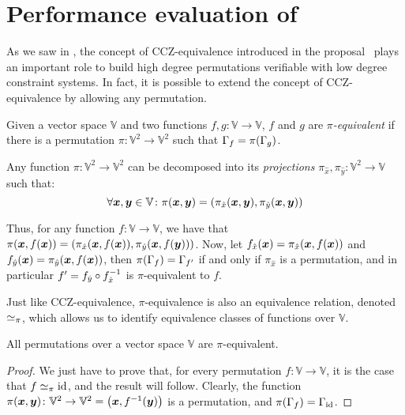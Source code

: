 \section{Performance evaluation of \Arion}\label{sec:performance}
As we saw in , the concept of CCZ-equivalence introduced in the \Anemoi{} 
proposal~\cite{BouvierBCPSVW2022} plays an important role to build high degree permutations 
verifiable with low degree constraint systems.
In fact, it is possible to extend the concept of CCZ-equivalence by allowing any permutation.
\begin{definition}[\(\pi \)-equivalence]
  Given a vector space \(\mathbb{V}\) and two functions \(f,g\colon \mathbb{V} \to \mathbb{V}\), 
  \(f\) and \(g\) are \emph{\(\pi \)-equivalent} if there is a permutation 
  \(\pi\colon \mathbb{V}^2 \to \mathbb{V}^2\) such that \(\Gamma_{f} = \call{\pi}{\Gamma_{g}}\).
\end{definition}

Any function \(\pi\colon \mathbb{V}^2 \to \mathbb{V}^2\) can be decomposed into its 
\emph{projections} \(\pi_{\hat{x}}, \pi_{\hat{y}}\colon \mathbb{V}^2 \to \mathbb{V}\) such that:
\[
  \forall \bm{x}, \bm{y} \in \mathbb{V}\colon \call{\pi}{\bm{x}, \bm{y}} = 
    \Tuple{\call{\pi_{\hat{x}}}{\bm{x}, \bm{y}}, \call{\pi_{\hat{y}}}{\bm{x}, \bm{y}}}
\]

Thus, for any function \(f\colon \mathbb{V} \to \mathbb{V}\), we have that 
\(\call{\pi}{\bm{x}, \call{f}{\bm{x}}} = 
  \Tuple{\call{\pi_{\hat{x}}}{\bm{x}, \call{f}{\bm{x}}}, 
  \call{\pi_{\hat{y}}}{\bm{x}, \call{f}{\bm{y}}}}\).
Now, let \(\call{f_{\hat{x}}}{\bm{x}} = \call{\pi_{\hat{x}}}{\bm{x}, \call{f}{\bm{x}}}\) and 
\(\call{f_{\hat{y}}}{\bm{x}} = \call{\pi_{\hat{y}}}{\bm{x}, \call{f}{\bm{x}}}\), then 
\(\call{\pi}{\Gamma_f} = \Gamma_{f'}\) if and only if \(\pi_{\hat{x}}\) is a permutation, and 
in particular \(f' = f_{\hat{y}} \circ f_{\hat{x}}^{-1}\) is \(\pi \)-equivalent to \(f\).

Just like CCZ-equivalence, \(\pi \)-equivalence is also an equivalence relation, denoted 
\(\simeq_{\pi} \), which allows us to identify equivalence classes of functions over \(\mathbb{V}\).
\begin{lemma}\label{lem:pi_equiv}
  All permutations over a vector space \(\mathbb{V}\) are \(\pi \)-equivalent.
\end{lemma}
\begin{proof}
  We just have to prove that, for every permutation \(f\colon \mathbb{V} \to \mathbb{V}\), it 
  is the case that \(f \simeq_{\pi} \mathrm{id} \), and the result will follow.
  Clearly, the function \(\call{\pi}{\bm{x}, \bm{y}}\colon \mathbb{V}^2 \to \mathbb{V}^2 = 
    \Tuple{\bm{x}, \call{f^{-1}}{\bm{y}}}\) is a permutation, and 
  \(\call{\pi}{\Gamma_f} = \Gamma_{\fooid}\).
\end{proof}

